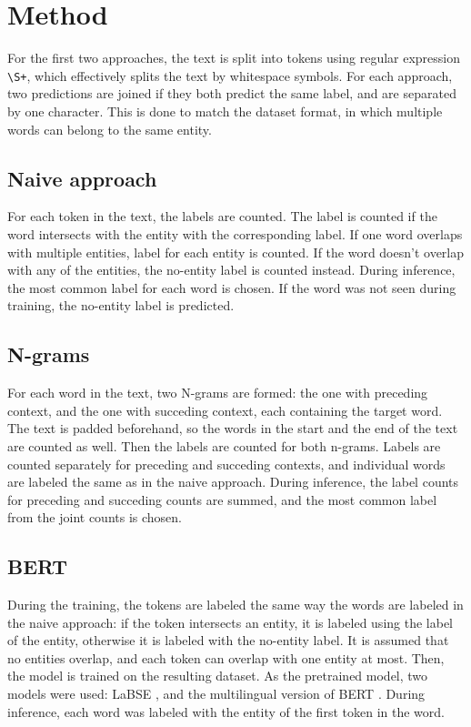 \documentclass{article}
\begin{document}
\section{Method}

For the first two approaches, the text is split into tokens using regular
expression \verb|\S+|, which effectively splits the text by whitespace
symbols. For each approach, two predictions are joined if they both predict
the same label, and are separated by one character. This is done to match the
dataset format, in which multiple words can belong to the same entity.

\subsection{Naive approach}

For each token in the text, the labels are counted. The label is counted if the
word intersects with the entity with the corresponding label. If one word
overlaps with multiple entities, label for each entity is counted. If the word
doesn't overlap with any of the entities, the no-entity label is counted
instead. During inference, the most common label for each word is chosen. If
the word was not seen during training, the no-entity label is predicted.

\subsection{N-grams}

For each word in the text, two N-grams are formed: the one with preceding
context, and the one with succeding context, each containing the target word.
The text is padded beforehand, so the words in the start and the end of the
text are counted as well. Then the labels are counted for both n-grams. Labels
are counted separately for preceding and succeding contexts, and individual
words are labeled the same as in the naive approach. During inference, the
label counts for preceding and succeding counts are summed, and the most common
label from the joint counts is chosen.

\subsection{BERT}

During the training, the tokens are labeled the same way the words are labeled
in the naive approach: if the token intersects an entity, it is labeled using
the label of the entity, otherwise it is labeled with the no-entity label. It
is assumed that no entities overlap, and each token can overlap with one entity
at most. Then, the model is trained on the resulting dataset. As the pretrained
model, two models were used: LaBSE \cite{feng2022languageagnostic}, and
the multilingual version of BERT \cite{devlin2019bert}. During inference, each
word was labeled with the entity of the first token in the word.
\end{document}
